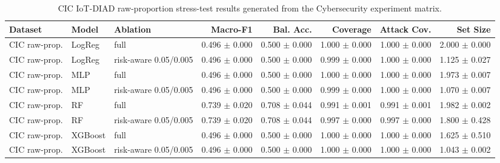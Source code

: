 \begin{table}[t]
\centering
\scriptsize
\setlength{\tabcolsep}{3pt}
\begin{tabular}{@{}lllrrrrr@{}}
\toprule
Dataset & Model & Ablation & Macro-F1 & Bal. Acc. & Coverage & Attack Cov. & Set Size \\
\midrule
CIC raw-prop. & LogReg & full & 0.496 $\pm$ 0.000 & 0.500 $\pm$ 0.000 & 1.000 $\pm$ 0.000 & 1.000 $\pm$ 0.000 & 2.000 $\pm$ 0.000 \\
CIC raw-prop. & LogReg & risk-aware 0.05/0.005 & 0.496 $\pm$ 0.000 & 0.500 $\pm$ 0.000 & 0.999 $\pm$ 0.000 & 1.000 $\pm$ 0.000 & 1.125 $\pm$ 0.027 \\
CIC raw-prop. & MLP & full & 0.496 $\pm$ 0.000 & 0.500 $\pm$ 0.000 & 1.000 $\pm$ 0.000 & 1.000 $\pm$ 0.000 & 1.973 $\pm$ 0.007 \\
CIC raw-prop. & MLP & risk-aware 0.05/0.005 & 0.496 $\pm$ 0.000 & 0.500 $\pm$ 0.000 & 0.999 $\pm$ 0.000 & 1.000 $\pm$ 0.000 & 1.070 $\pm$ 0.007 \\
CIC raw-prop. & RF & full & 0.739 $\pm$ 0.020 & 0.708 $\pm$ 0.044 & 0.991 $\pm$ 0.001 & 0.991 $\pm$ 0.001 & 1.982 $\pm$ 0.002 \\
CIC raw-prop. & RF & risk-aware 0.05/0.005 & 0.739 $\pm$ 0.020 & 0.708 $\pm$ 0.044 & 0.997 $\pm$ 0.000 & 0.997 $\pm$ 0.000 & 1.800 $\pm$ 0.428 \\
CIC raw-prop. & XGBoost & full & 0.496 $\pm$ 0.000 & 0.500 $\pm$ 0.000 & 1.000 $\pm$ 0.000 & 1.000 $\pm$ 0.000 & 1.625 $\pm$ 0.510 \\
CIC raw-prop. & XGBoost & risk-aware 0.05/0.005 & 0.496 $\pm$ 0.000 & 0.500 $\pm$ 0.000 & 1.000 $\pm$ 0.000 & 1.000 $\pm$ 0.000 & 1.043 $\pm$ 0.002 \\
\bottomrule
\end{tabular}
\caption{CIC IoT-DIAD raw-proportion stress-test results generated from the Cybersecurity experiment matrix.}
\label{tab:cic-raw-proportion}
\end{table}
